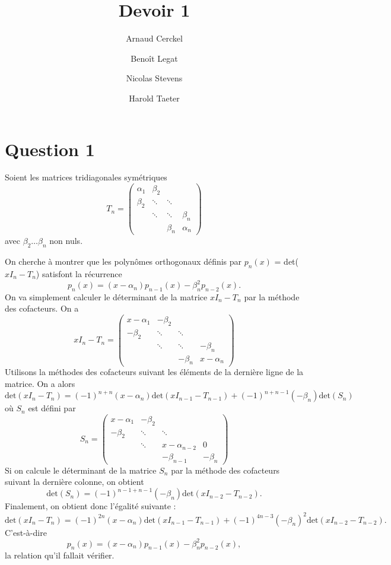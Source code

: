 \documentclass{article}
\title{Devoir 1}
\author{Arnaud Cerckel \and Benoît Legat \and
Nicolas Stevens \and Harold Taeter}
\begin{document}
\maketitle

\section*{Question 1}
Soient les matrices tridiagonales symétriques
$$T_n =
\begin{pmatrix}
\alpha_1 & \beta_2 & & \\
\beta_2 & \ddots & \ddots & \\
 & \ddots & \ddots & \beta_n \\
 & & \beta_n & \alpha_n
\end{pmatrix}
$$
avec $\beta_2 \hdots \beta_n$ non nuls.

On cherche à montrer que les polynômes orthogonaux définis par $p_n(x)$ = det($x I_n - T_n$) satisfont la récurrence $$p_n(x) = (x-\alpha_n)p_{n-1}(x) - \beta_n^2 p_{n-2}(x).$$
On va simplement calculer le déterminant de la matrice $x I_n - T_n$ par la méthode des cofacteurs. On a
$$x I_n - T_n =
\begin{pmatrix}
x-\alpha_1 & -\beta_2 & & \\
-\beta_2 & \ddots & \ddots & \\
 & \ddots & \ddots & -\beta_n \\
 & & -\beta_n & x-\alpha_n
\end{pmatrix}
$$
Utilisons la méthodes des cofacteurs suivant les éléments de la dernière ligne de la matrice. On a alors $$\text{det}(x I_n - T_n) = (-1)^{n+n}(x-\alpha_n)\text{det}(x I_{n-1} - T_{n-1}) + (-1)^{n+n-1}(-\beta_n)\text{det}(S_n)$$ où $S_n$ est défini par
$$S_n =
\begin{pmatrix}
x-\alpha_1 & -\beta_2 & & \\
-\beta_2 & \ddots & \ddots & \\
 & \ddots & x-\alpha_{n-2} & 0 \\
 & & -\beta_{n-1} & -\beta_n
\end{pmatrix}
$$
Si on calcule le déterminant de la matrice $S_n$ par la méthode des cofacteurs suivant la dernière colonne, on obtient $$\text{det}(S_n) = (-1)^{n-1+n-1}(-\beta_n)\text{det}(x I_{n-2} - T_{n-2}).$$
Finalement, on obtient donc l'égalité suivante : $$\text{det}(x I_n - T_n) = (-1)^{2n}(x-\alpha_n)\text{det}(x I_{n-1} - T_{n-1}) + (-1)^{4n-3}(-\beta_n)^2\text{det}(x I_{n-2} - T_{n-2}).$$
C'est-à-dire $$p_n(x) = (x-\alpha_n)p_{n-1}(x) - \beta_n^2 p_{n-2}(x),$$ la relation qu'il fallait vérifier.
\end{document}
